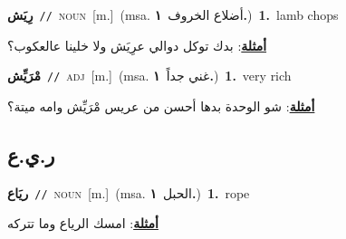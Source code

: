\documentclass[10pt,a4paper,twoside]{article} %
\begin{document}
\begin{multicols}{2}
{\setlength\topsep{0pt}\textbf{\foreignlanguage{arabic}{رِيَش}}\ {\color{gray}\texttt{//}\color{black}}\ \textsc{noun}\ [m.]\ \color{gray}(msa. \foreignlanguage{arabic}{أضلاع الخروف}~\foreignlanguage{arabic}{\textbf{١.}})\color{black}\ \textbf{1.}~lamb chops\  \begin{flushright}\color{gray}\foreignlanguage{arabic}{\textbf{\underline{\foreignlanguage{arabic}{أمثلة}}}: بدك توكل دوالي عرِيَش ولا خلينا عالعكوب؟}\end{flushright}\color{black}} \vspace{2mm}

{\setlength\topsep{0pt}\textbf{\foreignlanguage{arabic}{مْرَيِّش}}\ {\color{gray}\texttt{//}\color{black}}\ \textsc{adj}\ [m.]\ \color{gray}(msa. \foreignlanguage{arabic}{غني جداً}~\foreignlanguage{arabic}{\textbf{١.}})\color{black}\ \textbf{1.}~very rich\  \begin{flushright}\color{gray}\foreignlanguage{arabic}{\textbf{\underline{\foreignlanguage{arabic}{أمثلة}}}: شو الوحدة بدها أحسن من عريس مْرَيِّش وامه ميتة؟}\end{flushright}\color{black}} \vspace{2mm}

\vspace{-3mm}
\subsection*{\color{blue}\foreignlanguage{arabic}{ر.ي.ع}\color{blue}{}} 

{\setlength\topsep{0pt}\textbf{\foreignlanguage{arabic}{ريَاع}}\ {\color{gray}\texttt{//}\color{black}}\ \textsc{noun}\ [m.]\ \color{gray}(msa. \foreignlanguage{arabic}{الحبل}~\foreignlanguage{arabic}{\textbf{١.}})\color{black}\ \textbf{1.}~rope\  \begin{flushright}\color{gray}\foreignlanguage{arabic}{\textbf{\underline{\foreignlanguage{arabic}{أمثلة}}}: امسك الرياع وما تتركه}\end{flushright}\color{black}} \vspace{2mm}


\end{multicols}
\end{document}
